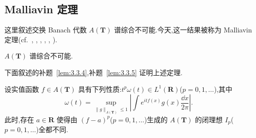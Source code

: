 \subsection{Malliavin 定理}\label{sec:3.3.2}

这里叙述交换 Banach 代数 $A(\mathbf{T})$ 谱综合不可能.今天,这一结果被称为 Malliavin 定理(cf.\ \cite{ch3:6}, \cite{ch3:7}, \cite{ch3:8}, \cite{ch3:11}, \cite{ch3:34}, \cite{ch3:39}).

\begin{theorem}[Malliavin]\label{thm:3.3.3}
$A(\mathbf{T})$ 谱综合不可能.
\end{theorem}

下面叙述的补题~\ref{lem:3.3.4},补题~\ref{lem:3.3.5} 证明上述定理.

\begin{lemma}\label{lem:3.3.4}
设实值函数 $f \in A(\mathbf{T})$ 具有下列性质:$t^{p}\omega(t) \in L^{1}(\mathbf{R})$($p = 0, 1, \ldots$),其中
\begin{equation*}
\omega(t) = \sup_{\|g\|_{A(\mathbf{T})} \leq 1}\left|\int e^{itf(x)}g(x)\frac{\dd x}{2\pi}\right|.
\end{equation*}
此时,存在 $a \in \mathbf{R}$ 使得由 $(f - a)^{p}$($p = 0, 1, \ldots$)生成的 $A(\mathbf{T})$ 的闭理想 $I_{p}$($p = 0, 1, \ldots$)全都不同.
\end{lemma}

